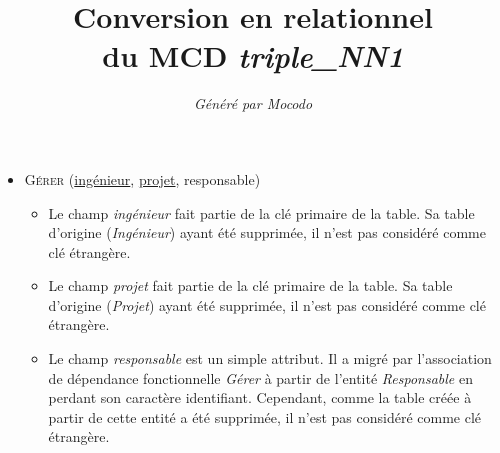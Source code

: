 \documentclass[a4paper]{article}
\title{Conversion en relationnel\\du MCD \emph{triple_NN1}}
\author{\emph{Généré par Mocodo}}
\newcommand{\relat}[1]{\textsc{#1}}
\newcommand{\attr}[1]{#1}
\newcommand{\prim}[1]{\uline{#1}}
\begin{document}
\maketitle

\begin{itemize}
  \item \relat{Gérer} (\prim{ingénieur}, \prim{projet}, \attr{responsable})
  \begin{itemize}
    \item Le champ \emph{ingénieur} fait partie de la clé primaire de la table. Sa table d'origine (\emph{Ingénieur}) ayant été supprimée, il n'est pas considéré comme clé étrangère.
    \item Le champ \emph{projet} fait partie de la clé primaire de la table. Sa table d'origine (\emph{Projet}) ayant été supprimée, il n'est pas considéré comme clé étrangère.
    \item Le champ \emph{responsable} est un simple attribut. Il a migré par l'association de dépendance fonctionnelle \emph{Gérer} à partir de l'entité \emph{Responsable} en perdant son caractère identifiant. Cependant, comme la table créée à partir de cette entité a été supprimée, il n'est pas considéré comme clé étrangère.
  \end{itemize}

\end{itemize}
\end{document}

